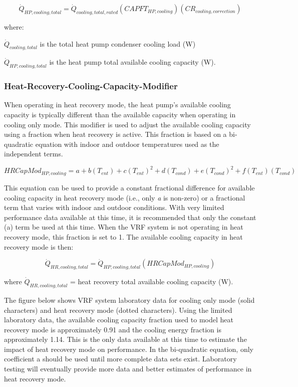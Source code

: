 \begin{equation}
  \dot{Q}_{HP,cooling,total} = \dot{Q}_{cooling,total,rated} \left( CAPFT_{HP,cooling} \right) \left( CR_{cooling,correction} \right)
\end{equation}

where:

\(\dot{Q}_{cooling,total}\) is the total heat pump condenser cooling load (W)

\(\dot{Q}_{HP,cooling,total}\) is the heat pump total available cooling capacity (W).

\subsubsection{Heat-Recovery-Cooling-Capacity-Modifier}\label{heat-recovery-cooling-capacity-modifier}

When operating in heat recovery mode, the heat pump's available cooling capacity is typically different than the available capacity when operating in cooling only mode. This modifier is used to adjust the available cooling capacity using a fraction when heat recovery is active. This fraction is based on a bi-quadratic equation with indoor and outdoor temperatures used as the independent terms.

\begin{equation}
  HRCapMod_{HP,cooling} = a + b \left( T_{ent} \right) + c \left( T_{ent} \right)^2 + d \left( T_{cond} \right) + e \left( T_{cond} \right)^2 + f \left( T_{ent} \right) \left( T_{cond} \right)
\end{equation}

This equation can be used to provide a constant fractional difference for available cooling capacity in heat recovery mode (i.e., only \emph{a} is non-zero) or a fractional term that varies with indoor and outdoor conditions. With very limited performance data available at this time, it is recommended that only the constant (a) term be used at this time. When the VRF system is not operating in heat recovery mode, this fraction is set to 1. The available cooling capacity in heat recovery mode is then:

\begin{equation}
  \dot{Q}_{HR,cooling,total} = \dot{Q}_{HP,cooling,total} \left( HRCapMod_{HP,cooling} \right)
\end{equation}

where \(\dot{Q}_{HR,cooling,total}\) = heat recovery total available cooling capacity (W).

The figure below shows VRF system laboratory data for cooling only mode (solid characters) and heat recovery mode (dotted characters). Using the limited laboratory data, the available cooling capacity fraction used to model heat recovery mode is approximately 0.91 and the cooling energy fraction is approximately 1.14. This is the only data available at this time to estimate the impact of heat recovery mode on performance. In the bi-quadratic equation, only coefficient a should be used until more complete data sets exist. Laboratory testing will eventually provide more data and better estimates of performance in heat recovery mode.

